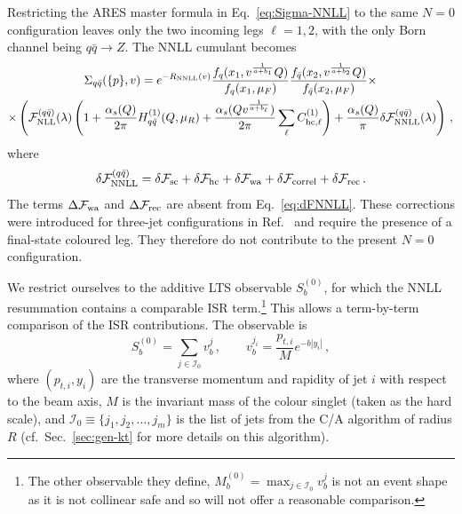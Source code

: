 Restricting the \textsc{ARES} master formula in Eq.~\eqref{eq:Sigma-NNLL}
 to the same $N=0$ configuration leaves only the two incoming legs 
 $\ell=1,2$, with the only Born channel being $q\bar q\to Z$. The NNLL
cumulant becomes
\begin{multline}
  \label{eq:Sigma-qqbar}
  \Sigma_{q\bar q}(\{p\},v)= e^{-R_{\rm NNLL}(v)} \frac{f_{q}(x_1,v^{\frac{1}{a+b_1}}Q)}{f_{q}(x_1,\mu_F)} \frac{f_{\bar q}(x_2,v^{\frac{1}{a+b_2}}Q)}{f_{\bar q}(x_2,\mu_F)}
  \times \\ \times
  \left(\mathcal{F}^{(q \bar q)}_{\rm NLL}(\lambda)\left(1+\frac{\alpha_s(Q)}{2\pi}H_{q \bar q}^{(1)}(Q,\mu_R)
      +\frac{\alpha_s(Q v^{\frac{1}{a+b_\ell}})}{2\pi}\sum_{\ell}C_{\mathrm{hc},\ell}^{(1)}\right) +\frac{\alpha_s(Q)}{\pi} \delta\mathcal{F}^{(q\bar q)}_{\rm NNLL}(\lambda)\right)\,,
\end{multline}
where 
\begin{equation}
\label{eq:dFNNLL-qq}
	 \delta\mathcal{F}^{(q\bar q)}_{\rm NNLL} = \delta\mathcal{F}_{\rm sc}+\delta\mathcal{F}_{\rm hc}+\delta\mathcal{F}_{\rm wa}+\delta\mathcal{F}_{\rm correl}+\delta \mathcal{F}_{\mathrm{rec}}\,.
\end{equation}
The terms $\Delta\mathcal{F}_{\rm wa}$ and $\Delta\mathcal{F}_{\rm rec}$
are absent from Eq.~\eqref{eq:dFNNLL}. These corrections were introduced
for three-jet configurations in Ref.~\cite{Arpino:2019ozn} and require the
presence of a final-state coloured leg. They therefore do not contribute
to the present $N=0$ configuration.

We restrict ourselves to the additive LTS observable $S_b^{(0)}$,
for which the NNLL resummation contains a comparable ISR
term.\footnote{The other observable they define, $M_b^{(0)}=\max_{j\in\mathcal{I}_0}v_b^j$
is not an event shape as it is not collinear safe and so will not offer a reasonable comparison.}
This allows a term-by-term
comparison of the ISR contributions. The observable is
\begin{equation} 
\label{eq:Sb0-def} 
S_b^{(0)} = \sum_{j\in\mathcal{I}_0}v_b^j \,, \qquad v_b^{j_i} = \frac{p_{t,i}}{M}e^{-b|y_i|}\,,
\end{equation} 
where $(p_{t,i},y_i)$ are the transverse momentum and rapidity of
jet $i$ with respect to the beam axis, $M$ is the invariant mass of
the colour singlet (taken as the hard scale), and
$\mathcal{I}_0\equiv\{j_1,j_2,\dots,j_m\}$ is the list of jets from
the C/A algorithm of radius $R$ (cf.\ Sec.~\ref{sec:gen-kt} for more details on
this algorithm). 

